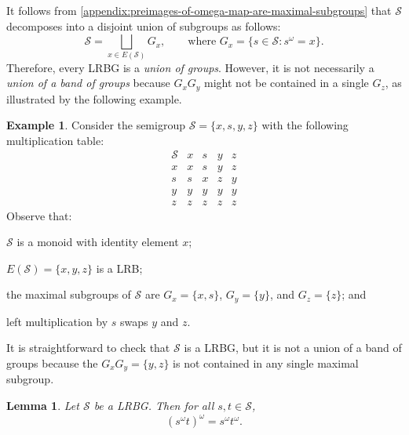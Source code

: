 \documentclass[11pt, oneside, reqno]{amsart}
\newtheorem{lemma}[theorem]{Lemma}
\theoremstyle{definition}
\newtheorem{example}[theorem]{Example}
\numberwithin{equation}{section}
\def \SS{{\mathcal{S}}}
\begin{document}
It follows from \cref{appendix:preimages-of-omega-map-are-maximal-subgroups} that
$\SS$ decomposes into a disjoint union of subgroups as follows:
\begin{equation}
    \label{LRBG-decomposition-union-of-groups}
    \SS = \bigsqcup_{x \in E(\SS)} G_x,
    \qquad\text{where~} G_x = \{s \in \SS: s^\omega = x\}.
\end{equation}
Therefore, every LRBG is a \emph{union of groups}. However, it is not
necessarily a \emph{union of a band of groups} because $G_x G_y$ might not be
contained in a single $G_z$, as illustrated by the following example.

\begin{example}
    \label{ex:not-strict}
    Consider the semigroup $\SS = \{x, s, y, z\}$ with the following multiplication table:
    \begin{equation*}
        \begin{array}{c|cccc}
            \SS & x & s & y & z \\ \hline
            x & x & s & y & z \\
            s & s & x & z & y \\
            y & y & y & y & y \\
            z & z & z & z & z
        \end{array}
    \end{equation*}
    Observe that:
    \begin{enumerate*}[label=(\roman*)]
        \item
            $\SS$ is a monoid with identity element $x$;

        \item
            $E(\SS) = \{x, y, z\}$ is a LRB;

        \item
            the maximal subgroups of $\SS$ are
            $G_{x} = \{x, s\}$, $G_{y} = \{y\}$, and $G_{z} = \{z\}$; and

        \item
            left multiplication by $s$ swaps $y$ and $z$.
    \end{enumerate*}
    It is straightforward to check that $\SS$ is a LRBG, but it is not a union
    of a band of groups because the $G_{x} G_{y} = \{y, z\}$ is not contained in
    any single maximal subgroup.
\end{example}

\begin{lemma}
    Let $\SS$ be a LRBG. Then for all $s, t \in \SS$,
    \begin{equation}
        \label{(s^omega-t)^omega}
        (s^\omega t)^\omega = s^\omega t^\omega.
    \end{equation}
\end{lemma}
\end{document}
